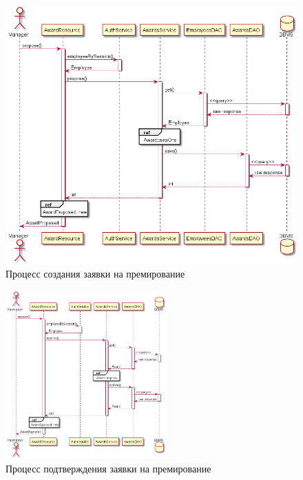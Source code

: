 \begin{figure}[H]
    \centering
    \includegraphics[width=\textwidth]{resources/02_implementation/02_award_employee.png}
    \caption{Процесс создания заявки на премирование}
    \label{fig:02-propose-award}
\end{figure}

\begin{figure}[H]
    \centering
    \includegraphics[width=0.55\textwidth]{resources/02_implementation/03_accept_award.png}
    \caption{Процесс подтверждения заявки на премирование}
    \label{fig:02-accept-award}
\end{figure}

